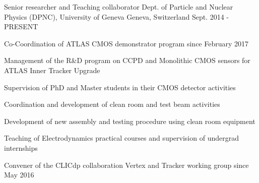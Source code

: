 

\begin{cventries}

  \cventry
    {Senior researcher and Teaching collaborator} %
    {Dept. of Particle and Nuclear Physics (DPNC), University of Geneva} %
    {Geneva, Switzerland} %
    {Sept. 2014 - PRESENT} %
    {
      \begin{cvitems} %
        \item Co-Coordination of ATLAS CMOS demonstrator program since February 2017
        \item Management of the R\&D program on CCPD and Monolithic CMOS sensors for ATLAS Inner Tracker Upgrade
        \item Supervision of PhD and Master students in their CMOS detector activities 
        \item Coordination and development of clean room and test beam activities
        \item Development of new assembly and testing procedure using clean room equipment 
        \item Teaching of Electrodynamics practical courses and supervision of undergrad internships
        \item Convener of the CLICdp collaboration Vertex and Tracker working group since May 2016
      \end{cvitems}
    }


\end{cventries}
